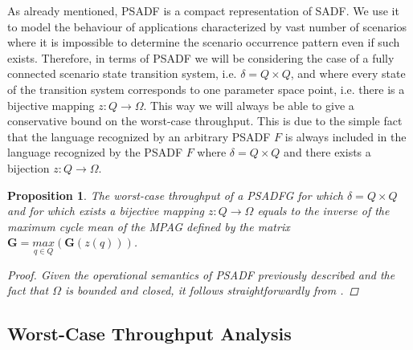 \documentclass[]{eptcs}
\newtheorem{myprop}{Proposition}
\begin{document}
As already  mentioned, PSADF is a compact representation of SADF. We use it to model the behaviour of applications characterized by vast number of scenarios where it is impossible to determine the scenario occurrence pattern even if such exists. Therefore, in terms of PSADF we will be considering the case of a fully connected scenario state transition system, i.e. $\delta = Q \times Q$, and where every state of the transition system corresponds to one parameter space point, i.e. there is a bijective mapping $z:Q \rightarrow \Omega$. This way we will always be able to give a conservative bound on the worst-case throughput. This is due to the simple fact that the language recognized by an arbitrary PSADF $F$ is always included in the language recognized by the PSADF $F$ where $\delta = Q \times Q$ and there exists a bijection $z:Q \rightarrow \Omega$.
\begin{myprop}
\label{prop:wct}
The worst-case throughput of a PSADFG for which $\delta = Q \times Q$ and for which exists a bijective mapping $z:Q \rightarrow \Omega$ equals to the inverse of the maximum cycle mean of the MPAG defined by the matrix $\mathbf{G}=\underset{q \in Q}{\mathit{max}}\left( \mathbf{G} (z(q))\right)$.
\begin{proof}
Given the operational semantics of PSADF previously described and the fact that $\Omega$ is bounded and closed, it follows straightforwardly from \cite{2geil:all}\cite{2gaub}.
\end{proof}
\end{myprop}
\subsection{Worst-Case Throughput Analysis}
\end{document}
